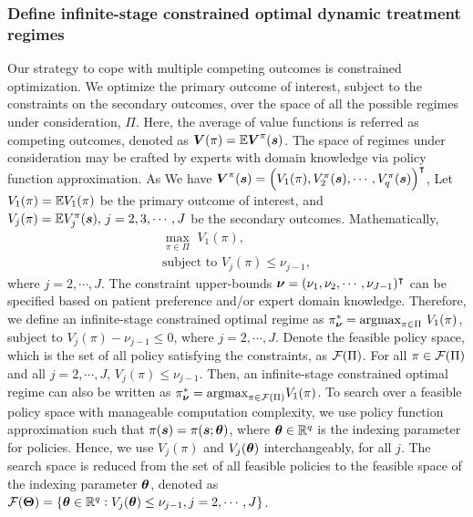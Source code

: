 \subsubsection*{Define infinite-stage constrained optimal dynamic treatment regimes}
Our strategy to cope with multiple competing outcomes is constrained optimization.  We optimize the primary outcome of interest, subject to the constraints on the secondary outcomes, over the space of all the possible regimes under consideration, $\Pi$. Here, the average of value functions is referred as competing outcomes, denoted as $\boldsymbol{V}(\pi) =\mathbb{E}\boldsymbol{V}^{\pi}(\boldsymbol{s}) $. The space of regimes under consideration may be crafted by experts with domain knowledge via policy function approximation. As We have $\boldsymbol{V}^{\pi}(\boldsymbol{s}) = \left( V_1({\pi}), V^{\pi}_2(\boldsymbol{s}), \cdots, V^{\pi}_q(\boldsymbol{s})\right)^\intercal$, Let $V_1(\pi) = \mathbb{E} V_1({\pi})$ be the primary outcome of interest, and $V_j(\pi) = \mathbb{E}V^{\pi}_j(\boldsymbol{s}), \, j = 2, 3, \cdots, J$ be the secondary outcomes. Mathematically, 
\begin{equation}
\begin{gathered}
\max_{\pi \in \Pi}  \,\, V_1(\pi), \\ 
\text{subject to}  \,\, V_j(\pi) \le \nu_{j-1},
\end{gathered}
\end{equation}
where $j = 2, \cdots, J$. The constraint upper-bounds $\boldsymbol{\nu} = (\nu_1, \nu_2, \cdots, \nu_{J-1})^\intercal$ can be specified based on patient preference and/or expert domain knowledge. Therefore, we define an infinite-stage  constrained optimal regime as $\pi^*_{\boldsymbol{\nu}} = \text{argmax}_{\pi \in \Pi} \,\, V_1({\pi})$, subject to $V_j(\pi) - \nu_{j-1} \le 0$, where $j = 2, \cdots, J$. Denote the feasible policy space, which is the set of all policy satisfying the constraints, as $\mathcal{F}(\Pi)$. For all $\pi \in \mathcal{F}(\Pi)$ and all $j = 2, \cdots, J$, $V_j({\pi}) \le \nu_{j-1}$. Then, an infinite-stage constrained optimal regime can also be written as $\pi^*_{\boldsymbol{\nu}} = \text{argmax}_{\pi \in \mathcal{F}(\Pi)}  V_1({\pi})$. To search over a feasible policy space with manageable computation complexity, we use policy function approximation such that $\pi(\boldsymbol{s})  = \pi(\boldsymbol{s}; \boldsymbol{\theta})$, where $\boldsymbol{\theta} \in \mathbb{R}^q$ is the indexing parameter for policies. Hence, we use $V_j(\pi)$ and $V_j(\boldsymbol{\theta})$ interchangeably, for all $j$. The search space is reduced from the set of all feasible policies to the feasible space of the indexing parameter $\boldsymbol{\theta} $, denoted as $\mathcal{F}(\boldsymbol{\Theta}) = \{ \boldsymbol{\theta} \in \mathbb{R}^q :  V_j(\boldsymbol{\theta}) \le \nu_{j-1},  j = 2, \cdots, J\}$.  \\

